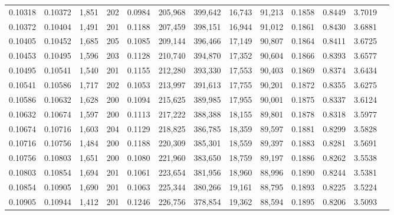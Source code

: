\begin{tabular}{rrrrrrrrrrrrr}
0.10318 & 0.10372 & 1,851 & 202 &                                     0.0984 & 205,968 & 399,642 &  16,743 &  91,213 & 0.1858 & 0.8449 & 3.7019 \\
0.10372 & 0.10404 & 1,491 & 201 &                                     0.1188 & 207,459 & 398,151 &  16,944 &  91,012 & 0.1861 & 0.8430 & 3.6881 \\
0.10405 & 0.10452 & 1,685 & 205 &                                     0.1085 & 209,144 & 396,466 &  17,149 &  90,807 & 0.1864 & 0.8411 & 3.6725 \\
0.10453 & 0.10495 & 1,596 & 203 &                                     0.1128 & 210,740 & 394,870 &  17,352 &  90,604 & 0.1866 & 0.8393 & 3.6577 \\
0.10495 & 0.10541 & 1,540 & 201 &                                     0.1155 & 212,280 & 393,330 &  17,553 &  90,403 & 0.1869 & 0.8374 & 3.6434 \\
0.10541 & 0.10586 & 1,717 & 202 &                                     0.1053 & 213,997 & 391,613 &  17,755 &  90,201 & 0.1872 & 0.8355 & 3.6275 \\
0.10586 & 0.10632 & 1,628 & 200 &                                     0.1094 & 215,625 & 389,985 &  17,955 &  90,001 & 0.1875 & 0.8337 & 3.6124 \\
0.10632 & 0.10674 & 1,597 & 200 &                                     0.1113 & 217,222 & 388,388 &  18,155 &  89,801 & 0.1878 & 0.8318 & 3.5977 \\
0.10674 & 0.10716 & 1,603 & 204 &                                     0.1129 & 218,825 & 386,785 &  18,359 &  89,597 & 0.1881 & 0.8299 & 3.5828 \\
0.10716 & 0.10756 & 1,484 & 200 &                                     0.1188 & 220,309 & 385,301 &  18,559 &  89,397 & 0.1883 & 0.8281 & 3.5691 \\
0.10756 & 0.10803 & 1,651 & 200 &                                     0.1080 & 221,960 & 383,650 &  18,759 &  89,197 & 0.1886 & 0.8262 & 3.5538 \\
0.10803 & 0.10854 & 1,694 & 201 &                                     0.1061 & 223,654 & 381,956 &  18,960 &  88,996 & 0.1890 & 0.8244 & 3.5381 \\
0.10854 & 0.10905 & 1,690 & 201 &                                     0.1063 & 225,344 & 380,266 &  19,161 &  88,795 & 0.1893 & 0.8225 & 3.5224 \\
0.10905 & 0.10944 & 1,412 & 201 &                                     0.1246 & 226,756 & 378,854 &  19,362 &  88,594 & 0.1895 & 0.8206 & 3.5093 \\

\end{tabular}
